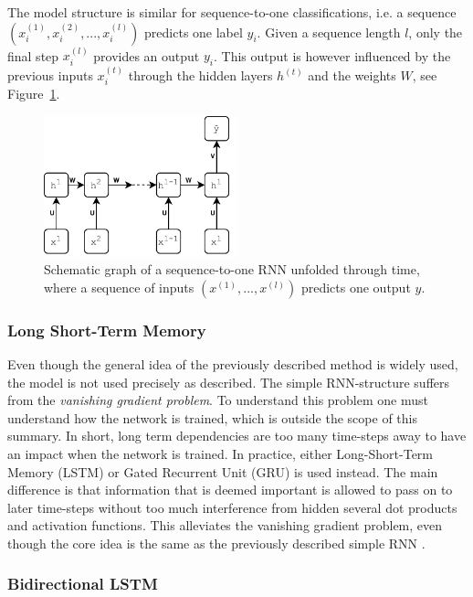 The model structure is similar for sequence-to-one classifications, i.e. a sequence $(x_i^{(1)}, x_i^{(2)}, ..., x_i^{(l)})$ predicts one label $\hat{y}_i$. Given a sequence length $l$, only the final step $x_i^{(l)}$ provides an output $y_i$. This output is however influenced by the previous inputs $x_i^{(t)}$ through the hidden layers $h^{(t)}$ and the weights $W$, see Figure~\ref{fig:rnns2o}. 


\begin{figure}[H]
    \centering
    \includegraphics[width=0.5\textwidth]{Figures/figs-rnn-s2o.pdf}
    \caption{Schematic graph of a sequence-to-one RNN unfolded through time, where a sequence of inputs $(x^{(1)}, ..., x^{(l)})$ predicts one output $y$.}
    \label{fig:rnns2o}
\end{figure}

\subsubsection*{Long Short-Term Memory}

Even though the general idea of the previously described method is widely used, the model is not used precisely as described. The simple RNN-structure suffers from the \textit{vanishing gradient problem}. To understand this problem one must understand how the network is trained, which is outside the scope of this summary. In short, long term dependencies are too many time-steps away to have an impact when the network is trained. In practice, either Long-Short-Term Memory (LSTM) or Gated Recurrent Unit (GRU) is used instead. The main difference is that information that is deemed important is allowed to pass on to later time-steps without too much interference from hidden several dot products and activation functions. This alleviates the vanishing gradient problem, even though the core idea is the same as the previously described simple RNN \citep{chollet2017deep}.

\subsubsection*{Bidirectional LSTM}


